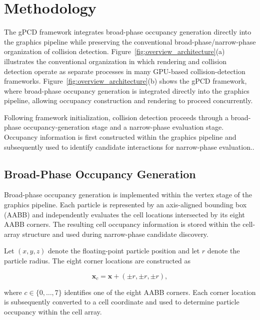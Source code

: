 \section{Methodology}

The gPCD framework integrates broad-phase occupancy generation directly
into the graphics pipeline while preserving the conventional
broad-phase/narrow-phase organization of collision detection.
Figure~\ref{fig:overview_architecture}(a) illustrates the conventional
organization in which rendering and collision detection operate as
separate processes in many GPU-based collision-detection frameworks.
Figure~\ref{fig:overview_architecture}(b) shows the gPCD framework,
where broad-phase occupancy generation is integrated directly into the
graphics pipeline, allowing occupancy construction and rendering to
proceed concurrently.

Following framework initialization, collision detection proceeds through
a broad-phase occupancy-generation stage and a narrow-phase evaluation
stage. Occupancy information is first constructed within the graphics
pipeline and subsequently used to identify candidate interactions for
narrow-phase evaluation..



\subsection{Broad-Phase Occupancy Generation}

Broad-phase occupancy generation is implemented within the vertex stage
of the graphics pipeline. Each particle is represented by an
axis-aligned bounding box (AABB) and independently evaluates the cell
locations intersected by its eight AABB corners. The resulting cell
occupancy information is stored within the cell-array structure and used
during narrow-phase candidate discovery.

Let $(x,y,z)$ denote the floating-point particle position and let
$r$ denote the particle radius. The eight corner locations are
constructed as

\begin{equation}
\mathbf{x}_c =\mathbf{x}+(\pm r,\pm r,\pm r),
\end{equation}

where $c \in \{0,\ldots,7\}$ identifies one of the eight AABB corners.
Each corner location is subsequently converted to a cell coordinate and
used to determine particle occupancy within the cell array.

